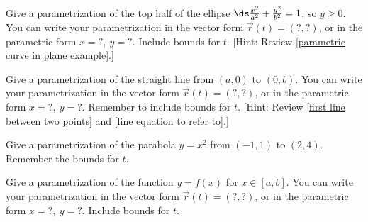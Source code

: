 \begin{problem}\label{parameterizing plane curves}
%
 Give a parametrization of the top half of the ellipse $\ds\frac{x^2}{a^2}+\frac{y^2}{b^2}=1$, so $y\geq 0$.
 You can write your parametrization in the vector form $\vec r(t)=(?,?)$, or in the parametric form $x=?,\ y=?$. 
 Include bounds for $t$. 
 [Hint: Review \ref{parametric curve in plane example}.]
\end{problem}


\begin{problem}
 Give a parametrization of the straight line from $(a,0)$ to $(0,b)$. 
 You can write your parametrization in the vector form $\vec r(t)=(?,?)$, or in the parametric form $x=?,\ y=?$. 
 Remember to include bounds for $t$. [Hint: Review \ref{first line between two points} and \ref{line equation to refer to}.]
\end{problem}


\begin{problem}
 Give a parametrization of the parabola $y=x^2$ from $(-1,1)$ to $(2,4)$. 
 Remember the bounds for $t$.
\end{problem}


\begin{problem}
 Give a parametrization of the function $y=f(x)$ for $x\in[a,b]$.
 You can write your parametrization in the vector form $\vec r(t)=(?,?)$, or in the parametric form $x=?,\ y=?$. 
 Include bounds for $t$.
\end{problem}




